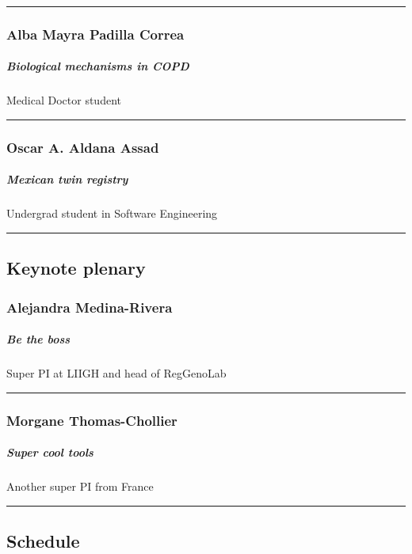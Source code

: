 \documentclass[]{article}
\let\oldsubparagraph\subparagraph
\renewcommand{\subparagraph}[1]{\oldsubparagraph{#1}\mbox{}}
\begin{document}
\begin{center}\rule{0.5\linewidth}{\linethickness}\end{center}

\subsubsection{Alba Mayra Padilla
Correa}\label{alba-mayra-padilla-correa}

\subparagraph{ Biological mechanisms in
COPD}\label{biological-mechanisms-in-copd}

Medical Doctor student

\begin{center}\rule{0.5\linewidth}{\linethickness}\end{center}

\subsubsection{Oscar A. Aldana Assad}\label{oscar-a.-aldana-assad}

\subparagraph{ Mexican twin registry}\label{mexican-twin-registry}

Undergrad student in Software Engineering

\begin{center}\rule{0.5\linewidth}{\linethickness}\end{center}

\subsection{Keynote plenary}\label{keynote-plenary}

\subsubsection{Alejandra Medina-Rivera}\label{alejandra-medina-rivera}

\subparagraph{ Be the boss}\label{be-the-boss}

Super PI at LIIGH and head of RegGenoLab

\begin{center}\rule{0.5\linewidth}{\linethickness}\end{center}

\subsubsection{Morgane Thomas-Chollier}\label{morgane-thomas-chollier}

\subparagraph{ Super cool tools}\label{super-cool-tools}

Another super PI from France

\begin{center}\rule{0.5\linewidth}{\linethickness}\end{center}

\subsection{Schedule}\label{schedule}
\end{document}
